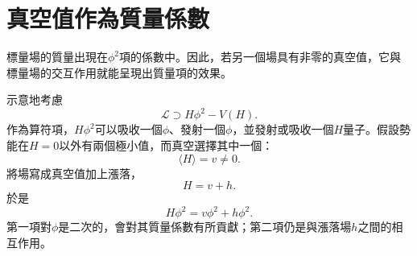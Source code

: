 \section{真空值作為質量係數}

標量場的質量出現在\(\phi^2\)項的係數中。因此，若另一個場具有非零的真空值，它與標量場的交互作用就能呈現出質量項的效果。

\begin{classroomqa}
\end{classroomqa}

示意地考慮
\begin{equation}
\mathcal L\supset H\phi^2-V(H).
\end{equation}
作為算符項，\(H\phi^2\)可以吸收一個\(\phi\)、發射一個\(\phi\)，並發射或吸收一個\(H\)量子。假設勢能在\(H=0\)以外有兩個極小值，而真空選擇其中一個：
\begin{equation}
\langle H\rangle=v\ne0.
\end{equation}
將場寫成真空值加上漲落，
\begin{equation}
H=v+h.
\end{equation}
於是
\begin{equation}
H\phi^2=v\phi^2+h\phi^2.
\end{equation}
第一項對\(\phi\)是二次的，會對其質量係數有所貢獻；第二項仍是與漲落場\(h\)之間的相互作用。

\begin{classroomqa}
\end{classroomqa}
